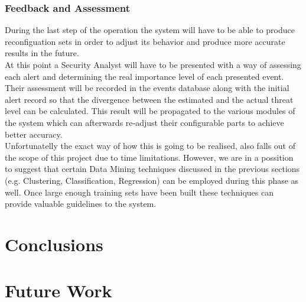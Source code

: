 \documentclass[12pt]{article}
\begin{document}
\subsubsection{Feedback and Assessment}
During the last step of the operation the system will have to be able to produce reconfiguation sets in order to adjust its behavior and produce more accurate results in the future.
\hfill \break\\
At this point a Security Analyst will have to be presented with a way of assessing each alert and  determining the real importance level of each presented event.
\hfill \break\\
Their assessment will be recorded in the events database along with the initial alert record so that the divergence between the estimated and the actual threat level can be calculated. This result will be propagated to the various modules of the system which can afterwards re-adjust their configurable parts to achieve better accuracy.
\hfill \break\\
Unfortunatelly the exact way of how this is going to be realised, also falls out of the scope of this project due to time limitations. However, we are in a possition to suggest that certain Data Mining techniques discussed in the previous sections (e.g. Clustering, Classification, Regression) can be employed during this phase as well. Once large enough training sets have been built these techniques can provide valuable guidelines to the system. 

\newpage
\section{Conclusions}

\newpage
\section{Future Work}
\end{document}
